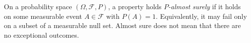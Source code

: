 
On a probability space $(\Omega,\mathcal F,P)$, a property holds \emph{$P$-almost surely} if it holds on some measurable event $A\in\mathcal F$ with $P(A)=1$. Equivalently, it may fail only on a subset of a measurable null set. Almost sure does not mean that there are no exceptional outcomes.

